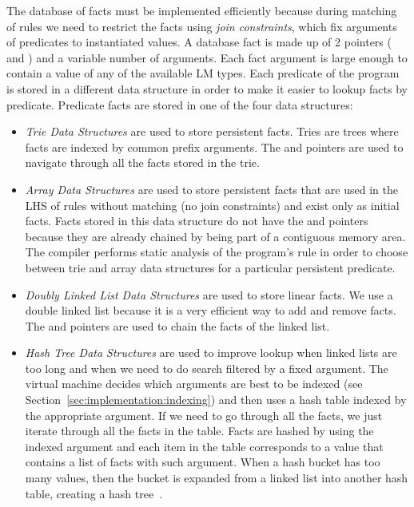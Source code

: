 The database of facts must be implemented efficiently because during matching of
rules we need to restrict the facts using \emph{join constraints}, which fix
arguments of predicates to instantiated values. A database fact is made up of 2
pointers ( and ) and a variable number of arguments.  Each
fact argument is large enough to contain a value of any of the available LM
types. Each predicate of the program is stored in a different data structure in
order to make it easier to lookup facts by predicate. Predicate facts are stored
in one of the four data structures:

\begin{itemize}

\item \emph{Trie Data Structures} are used to store persistent facts. Tries are
   trees where facts are indexed by common prefix arguments. The  and
    pointers are used to navigate through all the facts stored in the
   trie.

\item \emph{Array Data Structures} are used to store persistent facts that are
   used in the LHS of rules without matching (no join constraints) and exist
   only as initial facts. Facts stored in this data structure do not have the
    and  pointers because they are already chained by
   being part of a contiguous memory area. The compiler performs static analysis
   of the program's rule in order to choose between trie and array data
   structures for a particular persistent predicate.

\item \emph{Doubly Linked List Data Structures} are used to store linear facts.
   We use a double linked list because it is a very efficient way to add and
   remove facts. The  and  pointers are used to chain
   the facts of the linked list.

\item \emph{Hash Tree Data Structures} are used to improve lookup when linked
   lists are too long and when we need to do search filtered by a fixed
   argument. The virtual machine decides which arguments are best to be indexed
   (see Section~\ref{sec:implementation:indexing}) and then uses a hash table
   indexed by the appropriate argument. If we need to go through all the facts,
   we just iterate through all the facts in the table. Facts are hashed by using
   the indexed argument and each item in the table corresponds to a value that
   contains a list of facts with such argument. When a hash bucket has too
   many values, then the bucket is expanded from a linked list into another hash
   table, creating a hash tree~\cite{Bagwell01idealhash}.

\end{itemize}

